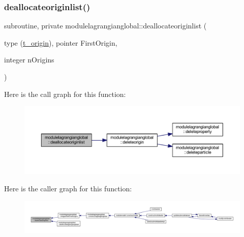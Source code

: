 \subsubsection{\texorpdfstring{deallocateoriginlist()}{deallocateoriginlist()}}
{\footnotesize\ttfamily subroutine, private modulelagrangianglobal\+::deallocateoriginlist (\begin{DoxyParamCaption}\item[{type (\mbox{\hyperlink{structmodulelagrangianglobal_1_1t__origin}{t\+\_\+origin}}), pointer}]{First\+Origin,  }\item[{integer}]{n\+Origins }\end{DoxyParamCaption})\hspace{0.3cm}{\ttfamily [private]}}

Here is the call graph for this function\+:\nopagebreak
\begin{figure}[H]
\begin{center}
\leavevmode
\includegraphics[width=350pt]{namespacemodulelagrangianglobal_a6e34918fa64284d7048a43df89293088_cgraph}
\end{center}
\end{figure}
Here is the caller graph for this function\+:\nopagebreak
\begin{figure}[H]
\begin{center}
\leavevmode
\includegraphics[width=350pt]{namespacemodulelagrangianglobal_a6e34918fa64284d7048a43df89293088_icgraph}
\end{center}
\end{figure}
\mbox{\label{namespacemodulelagrangianglobal_a47b61d17a8d0a48abe9ccb2937d67a93}} 
